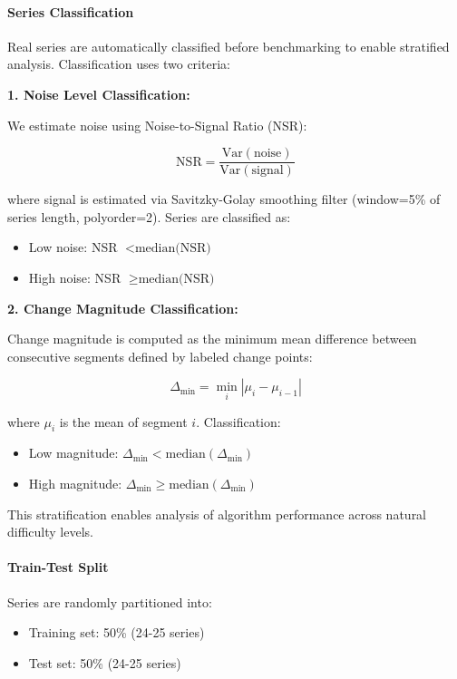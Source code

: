 \documentclass[journal,article,submit,pdftex,moreauthors]{Definitions/mdpi}
\begin{document}
\paragraph{Series Classification}

Real series are automatically classified before benchmarking to enable stratified analysis. Classification uses two criteria:

\textbf{1. Noise Level Classification:}

We estimate noise using Noise-to-Signal Ratio (NSR):

\begin{equation}
\text{NSR} = \frac{\text{Var}(\text{noise})}{\text{Var}(\text{signal})}
\end{equation}

where signal is estimated via Savitzky-Golay smoothing filter (window=5\% of series length, polyorder=2). Series are classified as:
\begin{itemize}
    \item Low noise: NSR $< \text{median(NSR)}$
    \item High noise: NSR $\geq \text{median(NSR)}$
\end{itemize}

\textbf{2. Change Magnitude Classification:}

Change magnitude is computed as the minimum mean difference between consecutive segments defined by labeled change points:

\begin{equation}
\Delta_{\text{min}} = \min_{i} |\mu_i - \mu_{i-1}|
\end{equation}

where $\mu_i$ is the mean of segment $i$. Classification:
\begin{itemize}
    \item Low magnitude: $\Delta_{\text{min}} < \text{median}(\Delta_{\text{min}})$
    \item High magnitude: $\Delta_{\text{min}} \geq \text{median}(\Delta_{\text{min}})$
\end{itemize}

This stratification enables analysis of algorithm performance across natural difficulty levels.

\paragraph{Train-Test Split}

Series are randomly partitioned into:
\begin{itemize}
    \item Training set: 50\% (24-25 series)
    \item Test set: 50\% (24-25 series)
\end{itemize}
\end{document}
